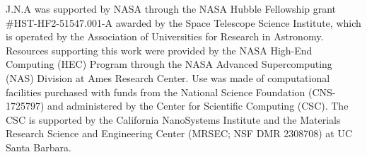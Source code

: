 \documentclass[]{spie}  %
\begin{document}
J.N.A was supported by NASA through the NASA Hubble Fellowship grant \#HST-HF2-51547.001-A awarded by the Space Telescope Science Institute, which is operated by the Association of Universities for Research in Astronomy. Resources supporting this work were provided by the NASA High-End Computing (HEC) Program through the NASA Advanced Supercomputing (NAS) Division at Ames Research Center. Use was made of computational facilities purchased with funds from the National Science Foundation (CNS-1725797) and administered by the Center for Scientific Computing (CSC). The CSC is supported by the California NanoSystems Institute and the Materials Research Science and Engineering Center (MRSEC; NSF DMR 2308708) at UC Santa Barbara.

\end{document}

